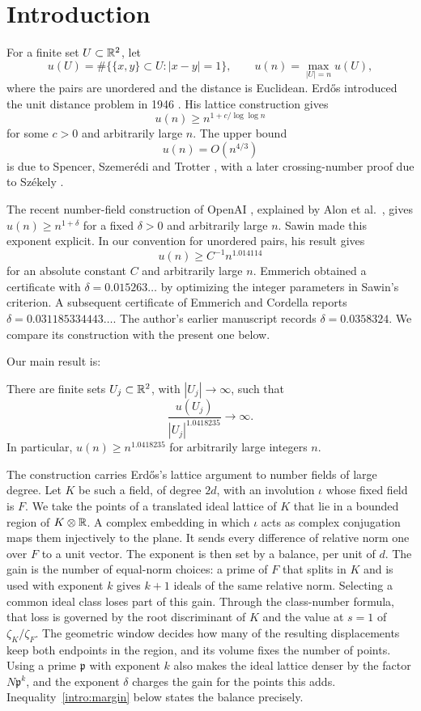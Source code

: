 \section{Introduction}
For a finite set $U\subset\mathbb R^2$, let
\[
 u(U)=\#\{\{x,y\}\subset U:|x-y|=1\},\qquad
 u(n)=\max_{|U|=n}u(U),
\]
where the pairs are unordered and the distance is Euclidean.
Erd\H{o}s introduced the unit distance problem in 1946
\cite{Erdos1946}. His lattice construction gives
\[
 u(n)\ge n^{1+c/\log\log n}
\]
for some $c>0$ and arbitrarily large $n$. The upper bound
\[
 u(n)=O(n^{4/3})
\]
is due to Spencer, Szemer\'edi and Trotter
\cite{SpencerSzemerediTrotter1984}, with a later crossing-number proof
due to Sz\'ekely \cite{Szekely1997}.

The recent number-field construction of OpenAI \cite{OpenAI2026},
explained by Alon et al.~\cite{Alon2026}, gives
$u(n)\ge n^{1+\delta}$ for a fixed $\delta>0$ and arbitrarily large $n$.
Sawin \cite{Sawin2026} made this exponent explicit. In our convention
for unordered pairs, his result gives
\[
 u(n)\ge C^{-1}n^{1.014114}
\]
for an absolute constant $C$ and arbitrarily large $n$.
Emmerich \cite{Emmerich2026} obtained a certificate with
$\delta=0.015263\ldots$ by optimizing the integer parameters in Sawin's
criterion. A subsequent certificate of Emmerich and Cordella
\cite{EmmerichCordella2026} reports $\delta=0.031185334443\ldots$.
The author's earlier manuscript \cite{NaslundLegacy2026} records
$\delta=0.0358324$. We compare its construction with the present one below.

Our main result is:
\begin{theorem}\label{thm:main}
There are finite sets $U_j\subset\mathbb R^2$, with $|U_j|\to\infty$, such that
\[
 \frac{u(U_j)}{|U_j|^{1.0418235}}\longrightarrow\infty.
\]
In particular, $u(n)\ge n^{1.0418235}$ for arbitrarily large integers $n$.
\end{theorem}

The construction carries Erd\H{o}s's lattice argument to number fields
of large degree. Let $K$ be such a field, of degree $2d$, with an
involution $\iota$ whose fixed field is $F$. We take the points of a
translated ideal lattice of $K$ that lie in a bounded region of
$K\otimes\mathbb R$. A complex embedding in which $\iota$ acts as complex
conjugation maps them injectively to the plane. It sends every
difference of relative norm one over $F$ to a unit vector. The exponent
is then set by a balance, per unit of $d$. The gain is the number of
equal-norm choices: a prime of $F$ that splits in $K$ and is used with
exponent $k$ gives $k+1$ ideals of the same relative norm. Selecting a
common ideal class loses part of this gain. Through the class-number
formula, that loss is governed by the root discriminant of $K$ and the
value at $s=1$ of $\zeta_K/\zeta_F$. The geometric window decides how
many of the resulting displacements keep both endpoints in the region,
and its volume fixes the number of points. Using a prime $\mathfrak p$
with exponent $k$ also makes the ideal lattice denser by the factor
$N\mathfrak p^k$, and the exponent $\delta$ charges the gain for the
points this adds. Inequality~\eqref{intro:margin} below states the
balance precisely.


